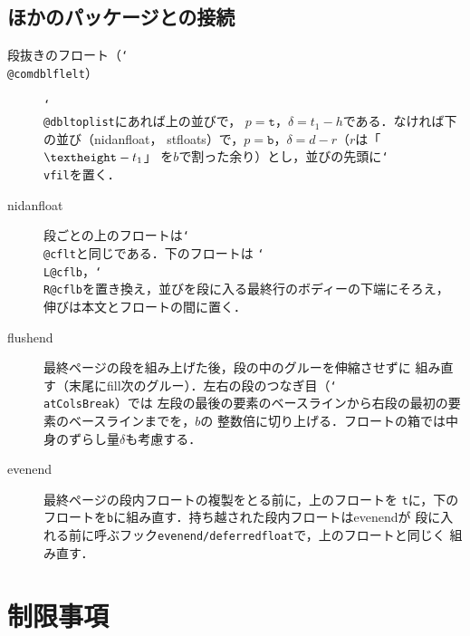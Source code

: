 \documentclass[paper=a4,dvipdfmx]{jlreq}
\newcommand\pkg[1]{\textsf{#1}}
\newcommand\opt[1]{\texttt{#1}}
\newcommand\cs[1]{\texttt{\char`\\#1}}
\begin{document}
\subsection{ほかのパッケージとの接続}

\begin{description}
\item[段抜きのフロート（\cs{@comdblflelt}）] \cs{@dbltoplist}にあれば上の並びで，
  $p=\opt{t}$，$\delta=t_1-h$である．なければ下の並び（\pkg{nidanfloat}，
  \pkg{stfloats}）で，$p=\opt{b}$，$\delta=d-r$（$r$は「$\cs{textheight}-t_1$」
  を$b$で割った余り）とし，並びの先頭に\cs{vfil}を置く．
\item[\pkg{nidanfloat}] 段ごとの上のフロートは\cs{@cflt}と同じである．下のフロートは
  \cs{L@cflb}，\cs{R@cflb}を置き換え，並びを段に入る最終行のボディーの下端にそろえ，
  伸びは本文とフロートの間に置く．
\item[\pkg{flushend}] 最終ページの段を組み上げた後，段の中のグルーを伸縮させずに
  組み直す（末尾にfill次のグルー）．左右の段のつなぎ目（\cs{atColsBreak}）では
  左段の最後の要素のベースラインから右段の最初の要素のベースラインまでを，$b$の
  整数倍に切り上げる．フロートの箱では中身のずらし量$\delta$も考慮する．
\item[\pkg{evenend}] 最終ページの段内フロートの複製をとる前に，上のフロートを
  \opt{t}に，下のフロートを\opt{b}に組み直す．持ち越された段内フロートはevenendが
  段に入れる前に呼ぶフック\texttt{evenend/deferredfloat}で，上のフロートと同じく
  組み直す．
\end{description}

\section{制限事項}
\label{sec:limit}
\end{document}
